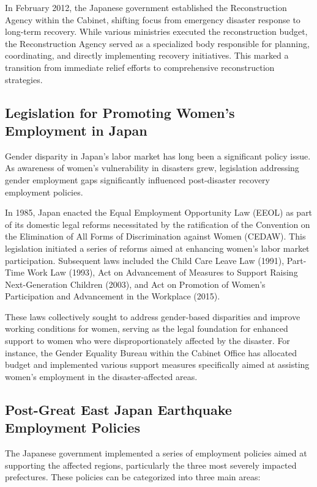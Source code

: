 \documentclass[a4paper,12pt]{article}
\begin{document}
In February 2012, the Japanese government established the Reconstruction Agency within the Cabinet, shifting focus from emergency disaster response to long-term recovery. While various ministries executed the reconstruction budget, the Reconstruction Agency served as a specialized body responsible for planning, coordinating, and directly implementing recovery initiatives. This marked a transition from immediate relief efforts to comprehensive reconstruction strategies.

\subsection{Legislation for Promoting Women's Employment in Japan}
Gender disparity in Japan's labor market has long been a significant policy issue. As awareness of women's vulnerability in disasters grew, legislation addressing gender employment gaps significantly influenced post-disaster recovery employment policies.

In 1985, Japan enacted the Equal Employment Opportunity Law (EEOL) as part of its domestic legal reforms necessitated by the ratification of the Convention on the Elimination of All Forms of Discrimination against Women (CEDAW). This legislation initiated a series of reforms aimed at enhancing women's labor market participation. Subsequent laws included the Child Care Leave Law (1991), Part-Time Work Law (1993), Act on Advancement of Measures to Support Raising Next-Generation Children (2003), and Act on Promotion of Women's Participation and Advancement in the Workplace (2015). 

These laws collectively sought to address gender-based disparities and improve working conditions for women, serving as the legal foundation for enhanced support to women who were disproportionately affected by the disaster. For instance, the Gender Equality Bureau within the Cabinet Office has allocated budget and implemented various support measures specifically aimed at assisting women's employment in the disaster-affected areas.

\subsection{Post-Great East Japan Earthquake Employment Policies}

The Japanese government implemented a series of employment policies aimed at supporting the affected regions, particularly the three most severely impacted prefectures. These policies can be categorized into three main areas:
\end{document}

